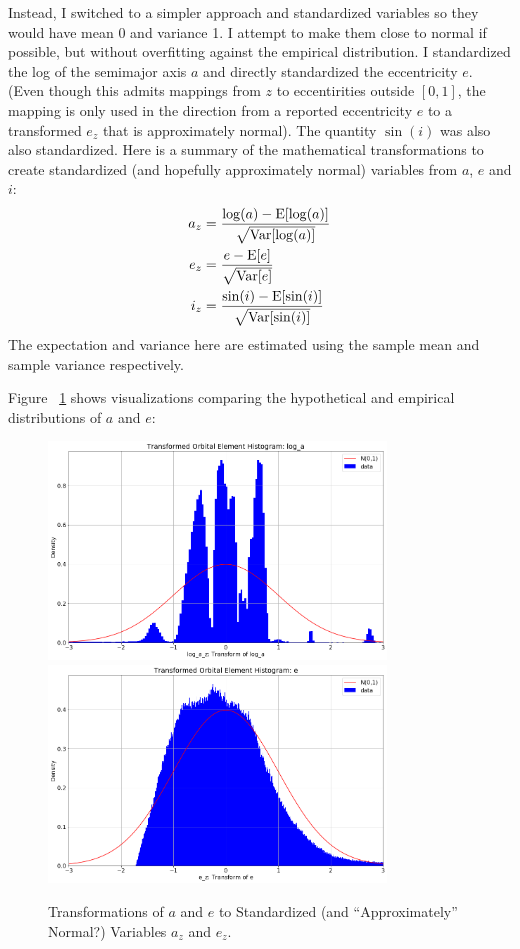 Instead, I switched to a simpler approach and standardized variables so they would have mean 0 and variance 1.
I attempt to make them close to normal if possible, but without overfitting against the empirical distribution.
I standardized the log of the semimajor axis $a$ and directly standardized the eccentricity $e$.
(Even though this admits mappings from $z$ to eccentirities outside $[0,1]$, the mapping is only used in the direction
from a reported eccentricity $e$ to a transformed $e_z$ that is approximately normal).
The quantity $\sin(i)$ was also also standardized.
Here is a summary of the mathematical transformations to create standardized 
(and hopefully approximately normal) variables from $a$, $e$ and $i$:
\begin{align*}
a_z &= \frac{\log(a) - \mathrm{E}[\log(a)]}{\sqrt{\mathrm{Var}[\log(a)]}} \\
e_z &= \frac{e - \mathrm{E}[e]}{\sqrt{\mathrm{Var}[e]}} \\
i_z &= \frac{\sin(i) - \mathrm{E}[\sin(i)]}{\sqrt{\mathrm{Var}[\sin(i)]}}
\end{align*}
The expectation and variance here are estimated using the sample mean and sample variance respectively.

Figure ~\ref{fig:ast_elt_standardize_a_e} shows visualizations comparing the hypothetical and empirical distributions of $a$ and $e$:
\begin{figure}[hbt!]
\begin{center}
\includegraphics[width=0.8\textwidth]{../figs/elts_cov/log_a_z.png}
\includegraphics[width=0.8\textwidth]{../figs/elts_cov/e_z.png}
\end{center}
\caption[Transformations of $a$ and $e$ to Standardized Variables $a_z$ and $e_z$]
{Transformations of $a$ and $e$ to Standardized (and ``Approximately'' Normal?) Variables $a_z$ and $e_z$.}
\label{fig:ast_elt_standardize_a_e}
\end{figure}
\clearpage

